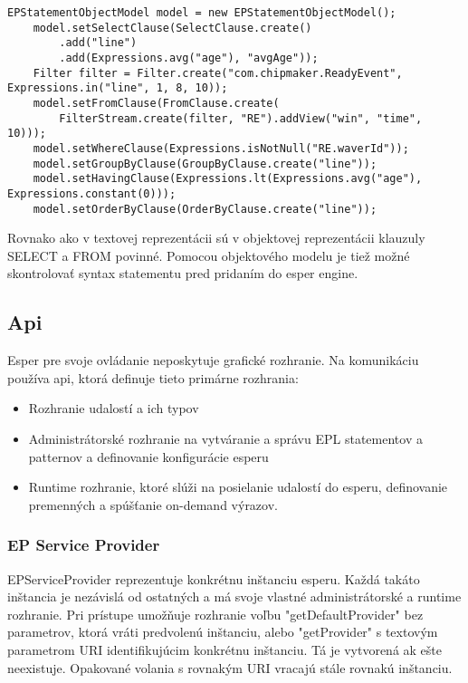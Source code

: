 		\begin{lstlisting}[float,label=lst:epl-model,caption=EPL statement s použitím objektového modelu]
	EPStatementObjectModel model = new EPStatementObjectModel();
	model.setSelectClause(SelectClause.create()
		.add("line")
		.add(Expressions.avg("age"), "avgAge"));
	Filter filter = Filter.create("com.chipmaker.ReadyEvent", Expressions.in("line", 1, 8, 10));
	model.setFromClause(FromClause.create(
		FilterStream.create(filter, "RE").addView("win", "time", 10)));
	model.setWhereClause(Expressions.isNotNull("RE.waverId"));
	model.setGroupByClause(GroupByClause.create("line"));
	model.setHavingClause(Expressions.lt(Expressions.avg("age"), Expressions.constant(0)));
	model.setOrderByClause(OrderByClause.create("line"));
		\end{lstlisting}
	
		Rovnako ako v textovej reprezentácii sú v objektovej reprezentácii klauzuly SELECT a FROM povinné. Pomocou objektového modelu je tiež možné skontrolovať syntax statementu pred pridaním do esper engine.
		
	\subsection{Api}
		Esper pre svoje ovládanie neposkytuje grafické rozhranie. Na komunikáciu používa api, ktorá definuje tieto primárne rozhrania:
		\begin{itemize}
			\item Rozhranie udalostí a ich typov
			\item Administrátorské rozhranie na vytváranie a správu EPL statementov a patternov a definovanie konfigurácie esperu
			\item Runtime rozhranie, ktoré slúži na posielanie udalostí do esperu, definovanie premenných a spúšťanie on-demand výrazov.
		\end{itemize}
		
		\subsubsection{EP Service Provider}
		EPServiceProvider reprezentuje konkrétnu inštanciu esperu. Každá takáto inštancia je nezávislá od ostatných a má svoje vlastné administrátorské a runtime rozhranie. Pri prístupe umožňuje rozhranie voľbu "getDefaultProvider" bez parametrov, ktorá vráti predvolenú inštanciu, alebo "getProvider" s textovým parametrom URI identifikujúcim konkrétnu inštanciu. Tá je vytvorená ak ešte neexistuje. Opakované volania s rovnakým URI vracajú stále rovnakú inštanciu.
		
